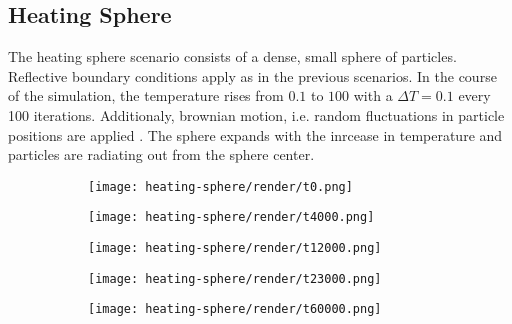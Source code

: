 \subsection{Heating Sphere}
\label{subsec:hs}
The heating sphere scenario consists of a dense, small sphere of particles. Reflective boundary conditions apply as in the previous scenarios. In the course of the simulation, the temperature rises from $0.1$ to $100$ with a $\Delta T=0.1$ every 100 iterations. Additionaly, brownian motion, i.e. random fluctuations in particle positions are applied \cite{Moerters2010}. The sphere expands with the inrcease in temperature and particles are radiating out from the sphere center.

\begin{figure}[htpb]
	\centering
	\begin{subfigure}[c]{.3\textwidth}
		\texttt{[image: heating-sphere/render/t0.png]}
	\end{subfigure}%
	\begin{subfigure}[c]{.3\textwidth}
		\texttt{[image: heating-sphere/render/t4000.png]}
	\end{subfigure}%
	\begin{subfigure}[c]{.3\textwidth}
		\centering
		\texttt{[image: heating-sphere/render/t12000.png]}
	\end{subfigure}
	\hspace*{.15\textwidth}
	\begin{subfigure}[c]{.3\textwidth}
		\texttt{[image: heating-sphere/render/t23000.png]}
	\end{subfigure}%
	\begin{subfigure}[c]{.3\textwidth}
		\vspace*{0.1\textwidth}
		\centering
		\texttt{[image: heating-sphere/render/t60000.png]}
		\vspace*{0.1\textwidth}
	\end{subfigure}%
	\hfill\begin{subfigure}[c]{.08\textwidth}
\end{subfigure}
\end{figure}

